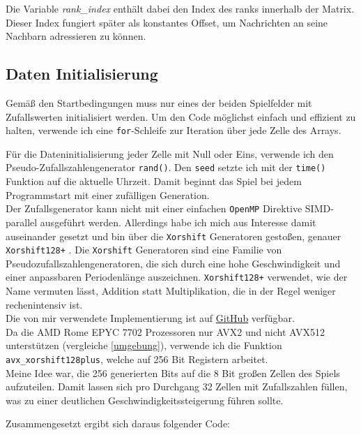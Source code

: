 \documentclass[german,plainarticle,hyperref,utf8]{zihpub}
\begin{document}
	Die Variable \textit{rank\_index} enthält dabei den Index des ranks innerhalb der Matrix. Dieser Index fungiert später als konstantes Offset, um Nachrichten an seine Nachbarn adressieren zu können.


	\subsection{Daten Initialisierung} \label{data_init}
	Gemäß den Startbedingungen muss nur eines der beiden Spielfelder mit Zufallswerten initialisiert werden.
	Um den Code möglichst einfach und effizient zu halten, verwende ich eine \texttt{for}-Schleife zur Iteration über jede Zelle des Arrays.
	
	Für die Dateninitialisierung jeder Zelle mit Null oder Eins, verwende ich den Pseudo-Zufallszahlengenerator \texttt{rand()}. Den \texttt{seed} setzte ich mit der \texttt{time()} Funktion auf die aktuelle Uhrzeit. Damit beginnt das Spiel bei jedem Programmstart mit einer zufälligen Generation.\\

	Der Zufallsgenerator kann nicht mit einer einfachen \texttt{OpenMP} Direktive SIMD-parallel ausgeführt werden. Allerdings habe ich mich aus Interesse damit auseinander gesetzt und bin über die \texttt{Xorshift} Generatoren gestoßen, genauer \texttt{Xorshift128+} \cite{xor}. Die \texttt{Xorshift} Generatoren sind eine Familie von Pseudozufallszahlengeneratoren, die sich durch eine hohe Geschwindigkeit und einer anpassbaren Periodenlänge auszeichnen.
	\texttt{Xorshift128+} verwendet, wie der Name vermuten lässt, Addition statt Multiplikation, die in der Regel weniger rechenintensiv ist.\\
	Die von mir verwendete Implementierung ist auf \href{https://github.com/lemire/SIMDxorshift}{GitHub} verfügbar.\\
	
	Da die AMD Rome EPYC 7702 Prozessoren nur AVX2 und nicht AVX512 unterstützen (vergleiche \ref{umgebung}), verwende ich die Funktion \texttt{avx\_xorshift128plus}, welche auf 256 Bit Registern arbeitet.\\
	Meine Idee war, die 256 generierten Bits auf die 8 Bit großen Zellen des Spiels aufzuteilen. Damit lassen sich pro Durchgang 32 Zellen mit Zufallszahlen füllen, was zu einer deutlichen Geschwindigkeitssteigerung führen sollte.
	
	Zusammengesetzt ergibt sich daraus folgender Code:\\
	
\end{document}
